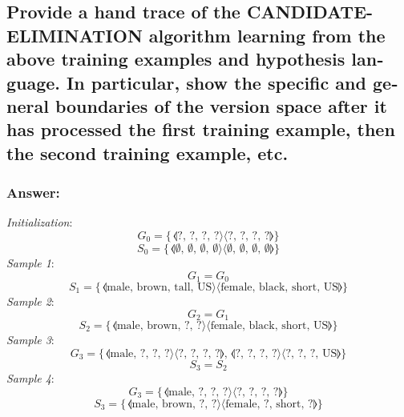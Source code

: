 \documentclass{article}
\newcommand{\mksample}[3]{#3 \hspace{2pt} \llangle \text{#1} \rangle \langle \text{#2} \rrangle}
\begin{document}
\begin{latin}
		\subsection{Provide a hand trace of the CANDIDATE-ELIMINATION algorithm learning from
			the above training examples and hypothesis language. In particular, show the
			specific and general boundaries of the version space after it has processed the first
			training example, then the second training example, etc.}
			\subsubsection*{Answer:}
			\textit{Initialization}:
			$$ G_0 = \{\mksample{?, ?, ?, ?}{?, ?, ?, ?}{} \} $$
			$$ S_0 = \{\mksample{$\emptyset$, $\emptyset$, $\emptyset$, $\emptyset$}{$\emptyset$, $\emptyset$, $\emptyset$, $\emptyset$}{} \} $$
			\textit{Sample 1}:
			$$ G_1 = G_0$$
			$$ S_1 = \{\mksample{male, brown, tall, US}{female, black, short, US}{}\} $$
			\textit{Sample 2}:
			$$ G_2 = G_1$$
			$$ S_2 = \{\mksample{male, brown, ?, ?}{female, black, short, US}{}\} $$
			\textit{Sample 3}:
			$$ G_3 = \{\mksample{male, ?, ?, ?}{?, ?, ?, ?}{}, \mksample{?, ?, ?, ?}{?, ?, ?, US}{}\} $$
			$$ S_3 = S_2 $$
			\textit{Sample 4}:
			$$ G_3 = \{\mksample{male, ?, ?, ?}{?, ?, ?, ?}{}\} $$
			$$ S_3 = \{\mksample{male, brown, ?, ?}{female, ?, short, ?}{}\} $$
	\end{latin}
\end{document}
